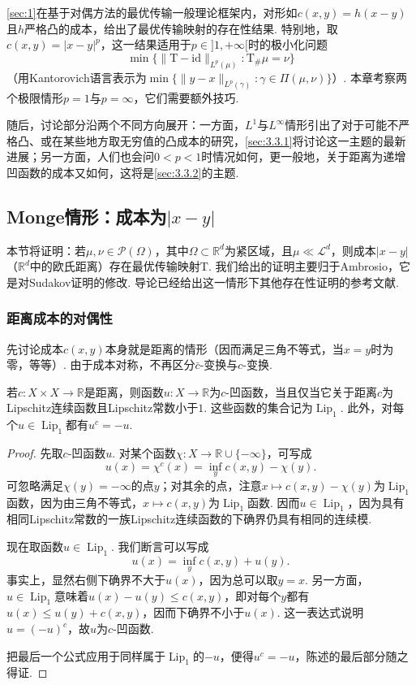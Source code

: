 \autoref{sec:1}在基于对偶方法的最优传输一般理论框架内，对形如$c(x,y)=h(x-y)$且$h$严格凸的成本，给出了最优传输映射的存在性结果. 特别地，取$c(x,y)=|x-y|^p$，这一结果适用于$p\in]1,+\infty[$时的极小化问题
\[
\min\{\|\mathrm T-\mathrm{id}\|_{L^p(\mu)}:\mathrm T_\#\mu=\nu\}
\]
（用Kantorovich语言表示为$\min\{\|y-x\|_{L^p(\gamma)}:\gamma\in\Pi(\mu,\nu)\}$）. 本章考察两个极限情形$p=1$与$p=\infty$，它们需要额外技巧.

随后，讨论部分沿两个不同方向展开：一方面，$L^1$与$L^\infty$情形引出了对于可能不严格凸、或在某些地方取无穷值的凸成本的研究，\autoref{sec:3.3.1}将讨论这一主题的最新进展；另一方面，人们也会问$0<p<1$时情况如何，更一般地，关于距离为递增凹函数的成本又如何，这将是\autoref{sec:3.3.2}的主题.

\subsection[成本为距离的Monge情形]{Monge情形：成本为$|x-y|$}\label{sec:3.1}
本节将证明：若$\mu,\nu\in\mathscr P(\Omega)$，其中$\Omega\subset\mathbb R^d$为紧区域，且$\mu\ll\mathscr L^d$，则成本$|x-y|$（$\mathbb R^d$中的欧氏距离）存在最优传输映射$\mathrm T$. 我们给出的证明主要归于Ambrosio\cite{b8}，它是对Sudakov证明\cite{b290}的修改. 导论已经给出这一情形下其他存在性证明的参考文献.

\subsubsection{距离成本的对偶性}\label{sec:3.1.1}
先讨论成本$c(x,y)$本身就是距离的情形（因而满足三角不等式，当$x=y$时为零，等等）. 由于成本对称，不再区分$\bar c$-变换与$c$-变换.

\begin{proposition}\label{obj:3.1}
若$c:X\times X\to\mathbb R$是距离，则函数$u:X\to\mathbb R$为$c$-凹函数，当且仅当它关于距离$c$为Lipschitz连续函数且Lipschitz常数小于$1$. 这些函数的集合记为$\operatorname{Lip}_1$. 此外，对每个$u\in\operatorname{Lip}_1$都有$u^c=-u$.
\end{proposition}

\begin{proof}
先取$c$-凹函数$u$. 对某个函数$\chi:X\to\mathbb R\cup\{-\infty\}$，可写成
\[
u(x)=\chi^c(x)=\inf_y c(x,y)-\chi(y).
\]
可忽略满足$\chi(y)=-\infty$的点$y$；对其余的点，注意$x\mapsto c(x,y)-\chi(y)$为$\operatorname{Lip}_1$函数，因为由三角不等式，$x\mapsto c(x,y)$为$\operatorname{Lip}_1$函数. 因而$u\in\operatorname{Lip}_1$，因为具有相同Lipschitz常数的一族Lipschitz连续函数的下确界仍具有相同的连续模.

现在取函数$u\in\operatorname{Lip}_1$. 我们断言可以写成
\[
u(x)=\inf_y c(x,y)+u(y).
\]
事实上，显然右侧下确界不大于$u(x)$，因为总可以取$y=x$. 另一方面，$u\in\operatorname{Lip}_1$意味着$u(x)-u(y)\le c(x,y)$，即对每个$y$都有$u(x)\le u(y)+c(x,y)$，因而下确界不小于$u(x)$. 这一表达式说明$u=(-u)^c$，故$u$为$c$-凹函数.

把最后一个公式应用于同样属于$\operatorname{Lip}_1$的$-u$，便得$u^c=-u$，陈述的最后部分随之得证.
\end{proof}

